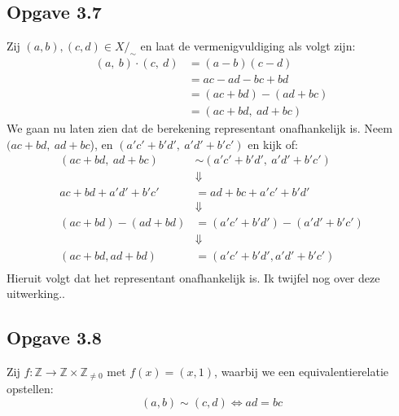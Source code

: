 \documentclass{article}
\newcommand{\Z}{\mathbb{Z}}
\newcommand{\q}{/_\sim}
\begin{document}
\subsection*{Opgave 3.7}
Zij $(a, b), (c, d) \in X\q$ en laat de vermenigvuldiging als volgt zijn:
\begin{align*}
    (a, \ b)\cdot(c, \ d) & = (a-b)(c-d)            \\
                          & = ac - ad - bc + bd     \\
                          & = (ac + bd) - (ad + bc) \\
                          & = (ac + bd, \ ad + bc)
\end{align*}
We gaan nu laten zien dat de berekening representant onafhankelijk is.
Neem \((ac + bd, \ ad + bc\)), en \((a'c' + b'd', \ a'd'+b'c')\) en kijk of:
\begin{align*}
    (ac + bd, \ ad + bc)  & \sim (a'c' + b'd', \ a'd' + b'c') \\
                          & \Downarrow                        \\
    ac + bd + a'd' + b'c' & = ad + bc + a'c' + b'd'           \\
                          & \Downarrow                        \\
    (ac + bd) - (ad + bd) & = (a'c' + b'd') - (a'd' + b'c')   \\
                          & \Downarrow                        \\
    (ac + bd, ad + bd)    & = (a'c' + b'd', a'd' + b'c')      \\
\end{align*}
Hieruit volgt dat het representant onafhankelijk is. Ik twijfel nog over deze uitwerking..

\subsection*{Opgave 3.8}
Zij $f: \Z \rightarrow \Z \times \Z_{\neq 0}$ met $f(x) = (x, 1)$, waarbij we een equivalentierelatie opstellen:
\[(a, b) \sim (c, d) \Longleftrightarrow ad = bc\]
\end{document}
